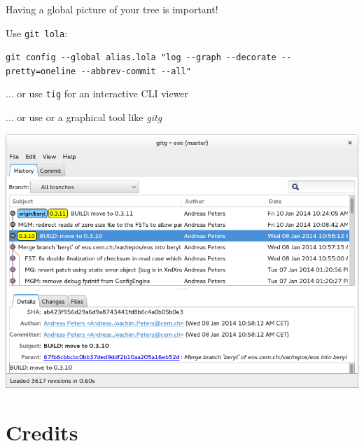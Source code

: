\begin{frame}
  \frametitle{\insertsubsection}

  Having a global picture of your tree is important!\\
  \vspace{20pt}

  Use \texttt{git lola}:\\

  \begin{footnotesize}
    \texttt{git config -{}-global alias.lola "log -{}-graph -{}-decorate -{}-pretty=oneline -{}-abbrev-commit -{}-all"}
  \end{footnotesize}

  \vspace{20pt}
  ... or use \texttt{tig} for an interactive CLI viewer

  \vspace{20pt}
  ... or use or a graphical tool like \textit{gitg}

\end{frame}


\begin{frame}[plain]

  \begin{center}
    \includegraphics[width=1.0\textwidth]{images/gitg.png}
  \end{center}
\end{frame}


\section{Credits}

